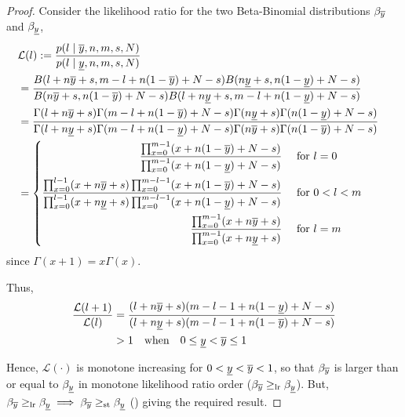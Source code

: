 \documentclass[12pt, a4paper]{elsarticle}
\begin{document}
\begin{proof}%
  \label{prf:y}
  Consider the likelihood ratio for the two Beta-Binomial distributions $\beta_{\overline{y}}$ and $\beta_{\underline{y}}$,
  \begin{align*}
    \lefteqn{\mathcal{L}(l) := \frac{p(l \mid \yu, n, m, s, N)}{p(l \mid \yl, n, m, s, N)}} \\
    &= \frac{B(l + n \yu + s, m - l + n (1 - \yu) + N - s) B(n \yl + s, n (1 - \yl) + N - s)}
            {B(n \yu + s, n (1 - \yu) + N - s) B(l + n \yl + s, m - l + n (1 - \yl) + N - s)} \\
    &= \frac{\Gamma(l + n \yu + s) \Gamma(m - l + n (1 - \yu) + N - s) \Gamma(n \yl + s) \Gamma(n (1 - \yl) + N - s)}
            {\Gamma(l + n \yl + s) \Gamma(m - l + n (1 - \yl) + N - s) \Gamma(n \yu + s) \Gamma(n (1 - \yu) + N - s)} \\
    &= \left\{ \begin{aligned}
         \frac{\prod_{x=0}^{m-1} (x + n (1 - \yu) + N - s)}
              {\prod_{x=0}^{m-1} (x + n (1 - \yl) + N - s)} &\quad\mbox{ for } l=0 \\
         \frac{\prod_{x=0}^{l-1} (x + n \yu + s) \prod_{x=0}^{m-l-1} (x + n (1 - \yu) + N - s)}
              {\prod_{x=0}^{l-1} (x + n \yl + s) \prod_{x=0}^{m-l-1} (x + n (1 - \yl) + N - s)} &\quad\mbox{ for } 0<l<m \\
         \frac{\prod_{x=0}^{m-1} (x + n \yu + s)}
              {\prod_{x=0}^{m-1} (x + n \yl + s)} &\quad\mbox{ for } l=m
       \end{aligned} \right.
  \end{align*}
  since $\Gamma(x+1)=x \Gamma(x)$.
  
  Thus,
  \begin{align*}
    \frac{\mathcal{L}(l+1)}{\mathcal{L}(l)} &=
      \frac{(l + n \overline{y} + s) (m - l - 1 + n (1 - \underline{y}) + N - s)}
           {(l + n \underline{y} + s) (m - l - 1 + n (1 - \overline{y}) + N - s)} \\
    &> 1 \quad\mbox{when}\quad 0 \le \underline{y} < \overline{y} \le 1
  \end{align*}
    
  Hence, $\mathcal{L}(\cdot)$ is monotone increasing for $0 < \underline{y} < \overline{y} < 1$, so that $\beta_{\overline{y}}$ is larger than or equal to $\beta_{\underline{y}}$ in monotone likelihood ratio order ($\beta_{\overline{y}} \ge_\mathrm{lr} \beta_{\underline{y}}$).  But, $\beta_{\overline{y}} \ge_\mathrm{lr} \beta_{\underline{y}} \implies \beta_{\overline{y}} \ge_\mathrm{st} \beta_{\underline{y}}$ (\cite[Theorem 1.C.1, p.43]{shaked2007}) giving the required result.
\end{proof}
\end{document}

